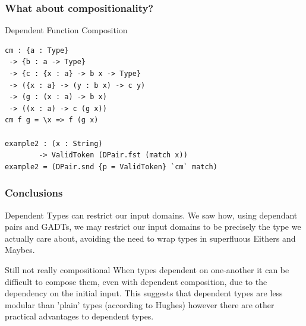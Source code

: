 \documentclass
  [hyperref={colorlinks = true,linkcolor = blue, 
             citecolor = blue, urlcolor = blue}
  ]{beamer}
\begin{document}
\begin{frame}[fragile]
\frametitle{What about compositionality?}
\begin{block}{Dependent Function Composition}
\begin{verbatim}
cm : {a : Type} 
 -> {b : a -> Type}
 -> {c : {x : a} -> b x -> Type}
 -> ({x : a} -> (y : b x) -> c y)
 -> (g : (x : a) -> b x)
 -> ((x : a) -> c (g x))
cm f g = \x => f (g x)

example2 : (x : String) 
        -> ValidToken (DPair.fst (match x))
example2 = (DPair.snd {p = ValidToken} `cm` match)
\end{verbatim}
\end{block}
\end{frame}

\begin{frame}[fragile]
\frametitle{Conclusions}
\begin{block}{Dependent Types can restrict our input domains.}
We saw how, using dependant pairs and GADTs, we may restrict
our input domains to be precisely the type we actually care
about, avoiding the need to wrap types in superfluous Eithers
and Maybes.
\end{block}
\begin{block}{Still not really compositional}
When types dependent on one-another it can be difficult to
compose them, even with dependent composition, due to the
dependency on the initial input. This suggests that dependent
types are less modular than 'plain' types (according to
Hughes) however there are other practical advantages to
dependent types.
\end{block}
\end{frame}
\end{document}
